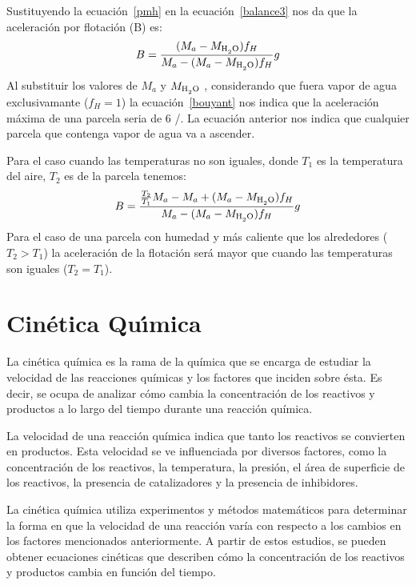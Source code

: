 Sustituyendo la ecuaci\'on~\ref{pmh} en la ecuaci\'on~\ref{balance3} nos da que la aceleraci\'on por flotaci\'on (B) es:
\begin{equation}
B=\frac{(M_a-M_{\ce{H2O}})f_H }{M_a-(M_a-M_{\ce{H2O}})f_H} g
\label{bouyant}
\end{equation}
Al substituir los valores de $M_a$ y $M_{\ce{H2O}}$ , considerando que fuera  vapor de agua exclusivamante ($f_H=1$) la ecuaci\'on~\ref{bouyant} nos indica que la aceleraci\'on m\'axima de una parcela seria de  $6$ \metre/\square\second . La ecuaci\'on anterior nos indica que cualquier parcela que contenga vapor de agua va a ascender.

Para el caso cuando las temperaturas no son iguales,  donde $T_1$ es la temperatura del aire, $T_2$ es de la parcela tenemos:
\begin{equation}
B=\frac{\frac{T_2}{T_1}M_a-M_a+(M_a-M_{\ce{H2O}})f_H }{M_a-(M_a-M_{\ce{H2O}})f_H} g
\label{bouyant2}
\end{equation}
Para el caso de una parcela con humedad y m\'as caliente que los alrededores ($T_2>T_1$) la aceleraci\'on de la flotaci\'on ser\'a mayor que cuando las temperaturas son iguales ($T_2=T_1$). 

\section[Cin\'etica]{Cin\'etica Qu\'{\i}mica}
\label{cineq}

La cinética química es la rama de la química que se encarga de estudiar la velocidad de las reacciones químicas y los factores que inciden sobre ésta. Es decir, se ocupa de analizar cómo cambia la concentración de los reactivos y productos a lo largo del tiempo durante una reacción química.

La velocidad de una reacción química indica que tanto  los reactivos se convierten en productos. Esta velocidad se ve influenciada por diversos factores, como la concentración de los reactivos, la temperatura, la presión, el área de superficie de los reactivos, la presencia de catalizadores y la presencia de inhibidores.

La cinética química utiliza experimentos y métodos matemáticos para determinar la forma en que la velocidad de una reacción varía con respecto a los cambios en los factores mencionados anteriormente. A partir de estos estudios, se pueden obtener ecuaciones cinéticas que describen cómo la concentración de los reactivos y productos cambia en función del tiempo.

